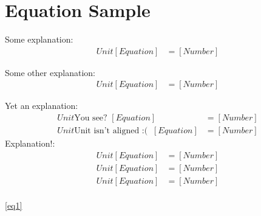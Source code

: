 \section{Equation Sample}

\noindent
Some explanation:
%
\begin{align}
\unit{Unit}
[Equation]&=[Number]
\label{eq1}
\end{align}

\noindent
Some other explanation:
%
\begin{align}
\unit{Unit}
[Equation]&=[Number]
\label{eq2}
\end{align}

\noindent
Yet an explanation:
%
\begin{align}
\unit{Unit}
\text{You see? } [Equation]&=[Number]
\label{eq3}\\
%
\unit{Unit}
\text{Unit isn't aligned } \textbf{:( } \: [Equation]&=[Number]
\label{eq4}	   %
\end{align}	 	%
\noindent	   	  %
Explanation!:	   %
\begin{align}	  	 %
\unit{Unit}		   	  %
[Equation]&=[Number]   %
\label{eq5}\\		 	%
\unit{Unit}			   	  %
[Equation]&=[Number]	   %
\label{eq6}\\			    %
\unit{Unit}				    %
[Equation]&=[Number]		%
\label{eq7}					%
\end{align}					%
\\
%
\noindent
\eqref{eq1}\\
\noindent
{}\\
\noindent
{}\\
\noindent
{}\\
\noindent
{}\\
\noindent
{}\\
\noindent
{}\\
\noindent
{}\\
\noindent
{}\\
\noindent
{}\\
\noindent
{}\\
\noindent
{}\\
\noindent
{}\\
\noindent
{}
\pagebreak